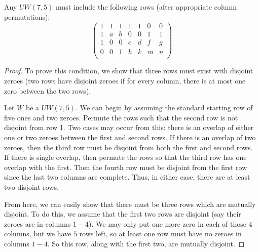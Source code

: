 \begin{lemma} \label{lem:uw75-top-rows}
Any $UW(7,5)$ must include the following rows (after appropriate column permutations):
$$
\left(
\begin{array}{ccccccc}
 1&1&1&1&1&0&0 \\
 1&a&b&0&0&1&1 \\
 1&0&0&c&d&f&g \\
 0&0&1&h&k&m&n \\
 \end{array}
\right)
$$
\begin{proof}
To prove this condition, we show that three rows must exist with disjoint zeroes (two rows have disjoint zeroes if for every column, there is at most one zero between the two rows).

Let $W$ be a $UW(7,5)$. We can begin by assuming the standard starting row of five ones and two zeroes. Permute the rows such that the second row is not disjoint from row 1. Two cases may occur from this: there is an overlap of either one or two zeroes between the first and second rows. If there is an overlap of two zeroes, then the third row must be disjoint from both the first and second rows. If there is single overlap, then permute the rows so that the third row has one overlap with the first. Then the fourth row must be disjoint from the first row since the last two columns are complete. Thus, in either case, there are at least two disjoint rows.

From here, we can easily show that there must be three rows which are mutually disjoint. To do this, we assume that the first two rows are disjoint (say their zeroes are in columns $1-4$). We may only put one more zero in each of those $4$ columns, but we have $5$ rows left, so at least one row must have no zeroes in columns $1-4$. So this row, along with the first two, are mutually disjoint.

\end{proof}

\end{lemma}

